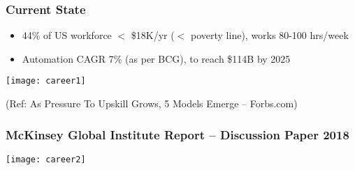 \begin{frame}[fragile]\frametitle{Current State}
\begin{itemize}
\item 44\% of US workforce $<$ \$18K/yr ($<$ poverty line), works 80-100 hrs/week
\item Automation CAGR 7\% (as per BCG), to reach \$114B by 2025
\end{itemize}

\begin{center}
\texttt{[image: career1]}
\end{center}

{\tiny (Ref: As Pressure To Upskill Grows, 5 Models Emerge – Forbs.com)}
\end{frame}


\begin{frame}[fragile]\frametitle{McKinsey Global Institute Report – Discussion Paper 2018}



\begin{center}
\texttt{[image: career2]}
\end{center}

\end{frame}



